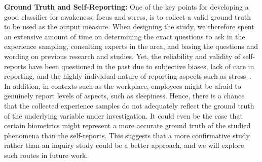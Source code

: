 \vspace{0.05in}
\noindent
\textbf{Ground Truth and Self-Reporting:} 
One of the key points for developing a good classifier for awakeness, focus and stress, is to collect a valid ground truth to be used as the output measure. When designing the study, we therefore spent an extensive amount of time on determining the exact questions to ask in the experience sampling, consulting experts in the area, and basing the questions and wording on previous research and studies. Yet, the reliability and validity of self-reports have been questioned in the past due to subjective biases, lack of care in reporting, and the highly individual nature of reporting aspects such as stress~\cite{Hernandez11,Hovsepian15}. In addition, in contexts such as the workplace, employees might be afraid to genuinely report levels of aspects, such as sleepiness. Hence, there is a chance that the collected experience samples do not adequately reflect the ground truth of the underlying variable under investigation. It could even be the case that certain biometrics might represent a more accurate ground truth of the studied phenomena than the self-reports. This suggests that a more confirmative study rather than an inquiry study could be a better approach, and we will explore such routes in future work.


